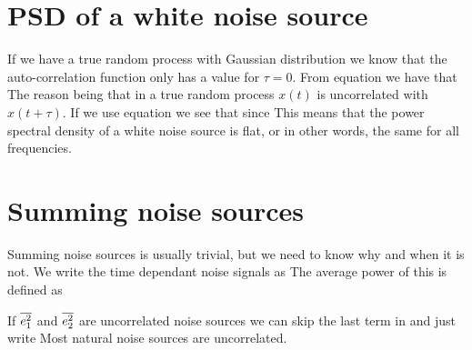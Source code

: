 \section{PSD of a white noise source}
If we have a true random process with Gaussian distribution we know that
the auto-correlation function only has a value for $\tau=0$. From
equation  we have that
The reason being that in a true random process $x(t)$ is uncorrelated
with $x(t + \tau )$. If we use equation  we
see that 
since
 This means that the power spectral
density of a white noise source is flat, or in other words, the same
for all frequencies.

\section{Summing noise sources}

Summing noise sources is usually trivial, but we need to know why and when it is not.
We write the  time dependant noise signals as 
The average power of this is defined as

If $\overline{e_{1}^2}$ and $\overline{e_{2}^2}$ are uncorrelated noise sources we can skip
the last term in  and just write
Most natural noise sources are uncorrelated.

